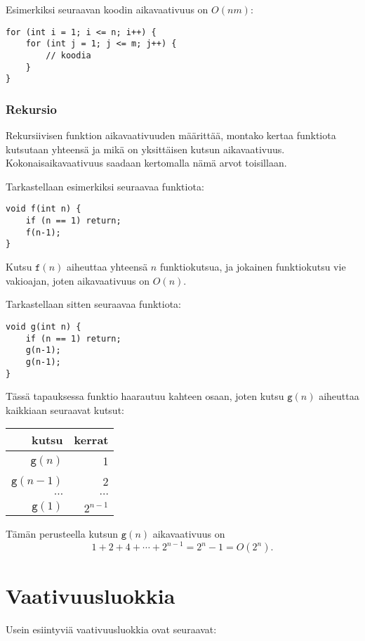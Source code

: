 Esimerkiksi seuraavan koodin
aikavaativuus on $O(nm)$:

\begin{lstlisting}
for (int i = 1; i <= n; i++) {
    for (int j = 1; j <= m; j++) {
        // koodia
    }
}
\end{lstlisting}

\subsubsection*{Rekursio}

Rekursiivisen funktion aikavaativuuden
määrittää, montako kertaa funktiota kutsutaan yhteensä
ja mikä on yksittäisen kutsun aikavaativuus.
Kokonais\-aikavaativuus saadaan kertomalla
nämä arvot toisillaan.

Tarkastellaan esimerkiksi seuraavaa funktiota:
\begin{lstlisting}
void f(int n) {
    if (n == 1) return;
    f(n-1);
}
\end{lstlisting}
Kutsu $\texttt{f}(n)$ aiheuttaa yhteensä $n$ funktiokutsua,
ja jokainen funktiokutsu vie vakioajan,
joten aikavaativuus on $O(n)$.

Tarkastellaan sitten seuraavaa funktiota:
\begin{lstlisting}
void g(int n) {
    if (n == 1) return;
    g(n-1);
    g(n-1);
}
\end{lstlisting}
Tässä tapauksessa funktio haarautuu kahteen osaan,
joten kutsu $\texttt{g}(n)$ aiheuttaa kaikkiaan seuraavat kutsut:
\begin{center}
\begin{tabular}{rr}
kutsu & kerrat \\
\hline
$\texttt{g}(n)$ & 1 \\
$\texttt{g}(n-1)$ & 2 \\
$\cdots$ & $\cdots$ \\
$\texttt{g}(1)$ & $2^{n-1}$ \\
\end{tabular}
\end{center}
Tämän perusteella kutsun $\texttt{g}(n)$ aikavaativuus on
\[1+2+4+\cdots+2^{n-1} = 2^n-1 = O(2^n).\]

\section{Vaativuusluokkia}


Usein esiintyviä vaativuusluokkia ovat seuraavat:

